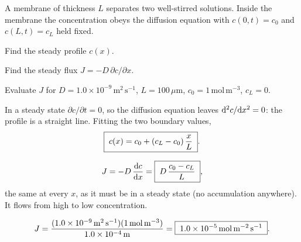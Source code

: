

A membrane of thickness $L$ separates two well-stirred solutions. Inside the
membrane the concentration obeys the diffusion equation with
$c(0,t)=c_0$ and $c(L,t)=c_L$ held fixed.
\begin{parts}
  \item Find the steady profile $c(x)$.
  \item Find the steady flux $J=-D\,\partial c/\partial x$.
  \item Evaluate $J$ for $D=1.0\times10^{-9}\,\mathrm{m^2\,s^{-1}}$,
        $L=100\,\mu\mathrm m$, $c_0=1\,\mathrm{mol\,m^{-3}}$, $c_L=0$.
\end{parts}

\solution

In a steady state $\partial c/\partial t=0$, so the diffusion equation leaves
$\mathrm{d}^2c/\mathrm{d} x^2=0$: the profile is a straight line. Fitting the two boundary
values,
\begin{equation}
  \boxed{\;c(x)=c_0+(c_L-c_0)\,\frac xL\;}.
\end{equation}

\begin{equation}
  J=-D\,\frac{\mathrm{d} c}{\mathrm{d} x}=\boxed{\;D\,\frac{c_0-c_L}{L}\;},
\end{equation}
the same at every $x$, as it must be in a steady state (no accumulation
anywhere). It flows from high to low concentration.

\begin{equation}
  J=\frac{(1.0\times10^{-9}\,\mathrm{m^2\,s^{-1}})(1\,\mathrm{mol\,m^{-3}})}{1.0\times10^{-4}\,\mathrm m}
  =\boxed{\;1.0\times10^{-5}\,\mathrm{mol\,m^{-2}\,s^{-1}}\;}.
\end{equation}
